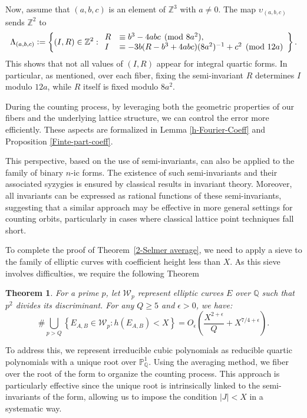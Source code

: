 \documentclass{article}
\def\Z{{\mathbb Z}}
\def\Q{{\mathbb Q}}
\def\Z{{\mathbb Z}}
\def\Q{{\mathbb Q}}
\newtheorem{theorem}{Theorem}[section]
\begin{document}
Now, assume that $(a,b,c)$ is an element of $\Z^3$ with $a\neq0$. The map $\upsilon_{(a,b,c)}$ sends $\Z^2$ to  
\begin{equation*}
   \Lambda_{(a,b,c)} \vcentcolon = \left\{ (I,R) \in \mathbb{Z}^2 :
   \begin{array}{ll}
        R &\equiv b^3 - 4abc \pmod{8a^2}, \\
        I &\equiv -3b(R - b^3 + 4abc)(8a^2)^{-1}  + c^2 \pmod{12a}
   \end{array} 
   \right\}.
\end{equation*}
This shows that not all values of $(I,R)$ appear for integral quartic forms. In particular, as mentioned, over each fiber, fixing the semi-invariant $R$ determines $I$ modulo $12a$, while $R$ itself is fixed modulo $8a^2$.

During the counting process, by leveraging both the geometric properties of our fibers and the underlying lattice structure, we can control the error more efficiently. These aspects are formalized in Lemma \ref{h-Fourier-Coeff} and Proposition \ref{Finte-part-coeff}.

This perspective, based on the use of semi-invariants, can also be applied to the family of  binary $n$-ic forms. The existence of such semi-invariants and their associated syzygies is ensured by classical results in invariant theory. Moreover, all invariants can be expressed as rational functions of these semi-invariants, suggesting that a similar approach may be effective in more general settings for counting orbits, particularly in cases where classical lattice point techniques fall short.

To complete the proof of Theorem~\ref{2-Selmer average}, we need to apply a sieve to the family of elliptic curves with coefficient height less than $X$. As this sieve involves difficulties, we require the following Theorem

\begin{theorem}\label{IJ-Sieve-introduction}
For a prime $p$, let $\mathcal{W}_p$ represent elliptic curves $E$ over $\Q$ such that $p^2$ divides its discriminant. For any $Q \geq 5$ and $\epsilon > 0$, we have:
\[
\# \bigcup_{p > Q} \left\{ E_{A, B} \in \mathcal{W}_p : h(E_{A,B}) < X \right\} = O_{\epsilon}\left( \frac{X^{2+\epsilon}}{Q} + X^{7/4+\epsilon} \right).
\]
\end{theorem}
To address this, we represent irreducible cubic polynomials as reducible quartic polynomials with a unique root over $\mathbb{P}^1_{\mathbb{Q}}$. Using the averaging method, we fiber over the root of the form to organize the counting process. This approach is particularly effective since the unique root is intrinsically linked to the semi-invariants of the form, allowing us to impose the condition $|J| < X$ in a systematic way.
\end{document}
